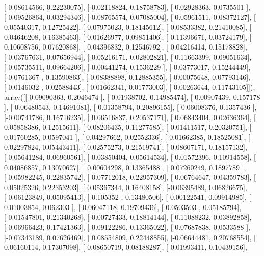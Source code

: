 \documentclass{article}
\begin{document}
       [ 0.08614566,  0.22230075],
       [-0.02118824,  0.18758783],
       [ 0.02928363,  0.0735501 ],
       [-0.09526864,  0.03294346],
       [-0.08765574,  0.07085004],
       [ 0.05961511,  0.08372127],
       [ 0.05540317,  0.12725422],
       [-0.07975023,  0.18145612],
       [ 0.08533382,  0.21410085],
       [ 0.04646208,  0.16385463],
       [ 0.01626977,  0.09851406],
       [ 0.11396671,  0.03724179],
       [ 0.10608756,  0.07620868],
       [ 0.04396832,  0.12546792],
       [ 0.04216414,  0.15178828],
       [-0.03767631,  0.07656944],
       [-0.05216171,  0.02802821],
       [ 0.11663399,  0.09051634],
       [-0.05735511,  0.09664206],
       [-0.00441274,  0.1536229 ],
       [-0.03773017,  0.15244449],
       [-0.0761367 ,  0.13590863],
       [-0.08388898,  0.12885355],
       [-0.00075648,  0.07793146],
       [-0.0146032 ,  0.02588443],
       [ 0.01662341,  0.01773003],
       [-0.00263644,  0.11743105]]), array([[-0.09090363,  0.2046474 ],
       [ 0.01938702,  0.14985474],
       [-0.00907439,  0.157178  ],
       [-0.06480543,  0.14691081],
       [ 0.01358794,  0.20896155],
       [ 0.06008376,  0.1357436 ],
       [-0.00741786,  0.16716235],
       [ 0.06516837,  0.20537171],
       [ 0.06843404,  0.02636364],
       [ 0.05858386,  0.12515611],
       [ 0.08206435,  0.11277585],
       [ 0.01411517,  0.20320751],
       [ 0.01760285,  0.0597041 ],
       [ 0.04297662,  0.02552336],
       [-0.01662385,  0.18525081],
       [ 0.02297824,  0.05443411],
       [-0.02575273,  0.21519741],
       [-0.08607171,  0.18157132],
       [-0.05641284,  0.06960561],
       [ 0.03850404,  0.05614534],
       [-0.01572396,  0.10914558],
       [ 0.04086857,  0.13070627],
       [ 0.00604298,  0.13365488],
       [ 0.07260249,  0.1897789 ],
       [-0.05982245,  0.22835742],
       [-0.07712018,  0.22957309],
       [-0.06764647,  0.04359783],
       [ 0.05025326,  0.22353203],
       [ 0.05367344,  0.16408158],
       [-0.06395489,  0.06826675],
       [-0.06123849,  0.05095413],
       [ 0.105352  ,  0.13480506],
       [ 0.00122541,  0.09914985],
       [ 0.01003854,  0.062303  ],
       [-0.06047118,  0.19709436],
       [-0.0503503 ,  0.05185794],
       [-0.01547801,  0.21340268],
       [-0.00727433,  0.18814144],
       [ 0.11088232,  0.03892858],
       [-0.06966423,  0.17421363],
       [ 0.09122286,  0.13365022],
       [-0.07687838,  0.0533588 ],
       [-0.07343189,  0.07626469],
       [ 0.08554809,  0.22448855],
       [-0.06644481,  0.20768554],
       [ 0.06160114,  0.17307098],
       [ 0.08650719,  0.08188287],
       [ 0.01993411,  0.10439156],
\end{document}
